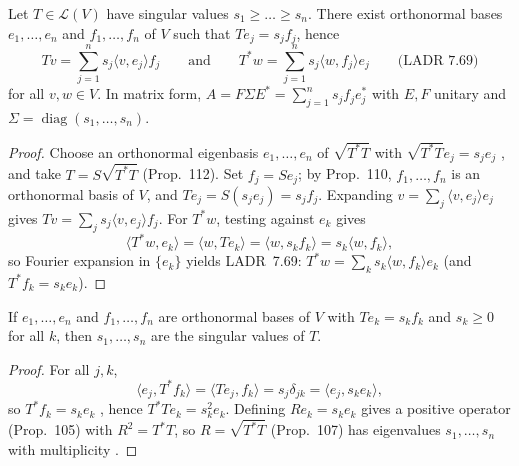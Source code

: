 \documentclass[10pt]{scrartcl}
\newcommand{\LL}{\mathcal L}\newcommand{\PP}{\mathcal P}\newcommand{\MM}{\mathcal M}
\begin{document}
\begin{theorem*}
  Let $T\in\LL(V)$ have singular values $s_1\ge\dots\ge s_n$. There exist orthonormal bases $e_1,\dots,e_n$ and $f_1,\dots,f_n$ of $V$ such that $Te_j=s_jf_j$, hence
  \[
    Tv = \sum_{j=1}^n s_j\langle v,e_j\rangle f_j \qquad\text{and}\qquad T^*w = \sum_{j=1}^n s_j\langle w,f_j\rangle e_j \qquad \text{(LADR 7.69)}
  \]
  for all $v,w\in V$. In matrix form, $A = F\Sigma E^* = \sum_{j=1}^n s_j f_j e_j^*$ with $E,F$ unitary and $\Sigma=\operatorname{diag}(s_1,\dots,s_n)$.
\end{theorem*}
\begin{proof}
  Choose an orthonormal eigenbasis $e_1,\dots,e_n$ of $\sqrt{T^*T}$ with $\sqrt{T^*T}e_j=s_j e_j$ , and take $T=S\sqrt{T^*T}$ (Prop.~112). Set $f_j=Se_j$; by Prop.~110, $f_1,\dots,f_n$ is an orthonormal basis of $V$, and $Te_j=S(s_j e_j)=s_j f_j$. Expanding $v=\sum_j\langle v,e_j\rangle e_j$  gives $Tv=\sum_j s_j\langle v,e_j\rangle f_j$. For $T^*w$, testing against $e_k$ gives
  \[ \langle T^*w,e_k\rangle = \langle w,Te_k\rangle = \langle w,s_k f_k\rangle = s_k\langle w,f_k\rangle, \]
  so Fourier expansion in $\{e_k\}$ yields LADR~7.69: $T^*w = \sum_k s_k\langle w,f_k\rangle e_k$ (and $T^*f_k=s_ke_k$).
\end{proof}

\begin{proposition*}
  If $e_1,\dots,e_n$ and $f_1,\dots,f_n$ are orthonormal bases of $V$ with $Te_k=s_k f_k$ and $s_k\ge0$ for all $k$, then $s_1,\dots,s_n$ are the singular values of $T$.
\end{proposition*}
\begin{proof}
  For all $j,k$,
  \[ \langle e_j,T^*f_k\rangle=\langle Te_j,f_k\rangle=s_j\delta_{jk}=\langle e_j,s_k e_k\rangle, \]
  so $T^*f_k=s_k e_k$ , hence $T^*Te_k=s_k^2 e_k$. Defining $Re_k=s_k e_k$ gives a positive operator (Prop.~105) with $R^2=T^*T$, so $R=\sqrt{T^*T}$ (Prop.~107) has eigenvalues $s_1,\dots,s_n$ with multiplicity .
\end{proof}
\end{document}
